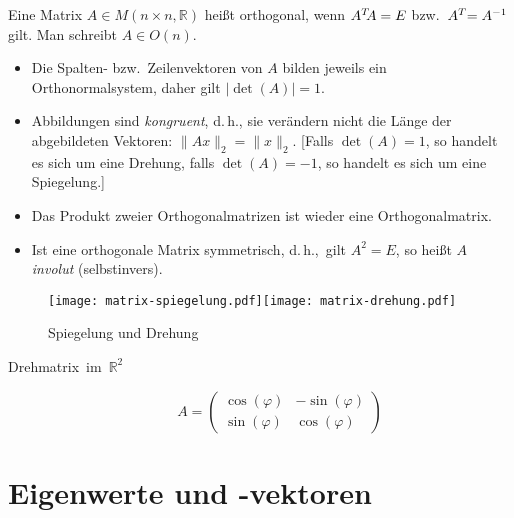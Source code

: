 Eine Matrix $A\in M(n\times n,\mathbb{R})$ heißt orthogonal, wenn $A\t A=E$ bzw.~$A\t=A^{-1}$ gilt.
Man schreibt $A\in O(n)$.
\begin{itemize}
  \item Die Spalten- bzw.~Zeilenvektoren von $A$ bilden jeweils ein Orthonormalsystem, daher gilt $\lvert\det(A)\rvert=1$.
  \item Abbildungen sind \emph{kongruent}, d.\,h., sie verändern nicht die Länge der abgebildeten Vektoren: $\lVert Ax \rVert_2 = \lVert x \rVert_2$.
	[Falls $\det(A)=1$, so handelt es sich um eine Drehung, falls $\det(A)=-1$, so handelt es sich um eine Spiegelung.]
  \item Das Produkt zweier Orthogonalmatrizen ist wieder eine Orthogonalmatrix.
  \item {}
	Ist eine orthogonale Matrix symmetrisch, d.\,h.,~gilt $A^2=E$, so heißt $A$ \emph{involut} (selbstinvers).
\end{itemize}

\begin{figure}[htb]
\centering\texttt{[image: matrix-spiegelung.pdf]}\hfil\texttt{[image: matrix-drehung.pdf]}

\caption{Spiegelung und Drehung}
\end{figure}

\begin{description}
\item [{Drehmatrix~im~$\mathbb{R}^{2}$}]
\[
  A = \begin{pmatrix}
    \cos(\varphi) & -\sin(\varphi) \\
    \sin(\varphi) &  \cos(\varphi)
  \end{pmatrix}
\]
\end{description}

\section{Eigenwerte und -vektoren}

